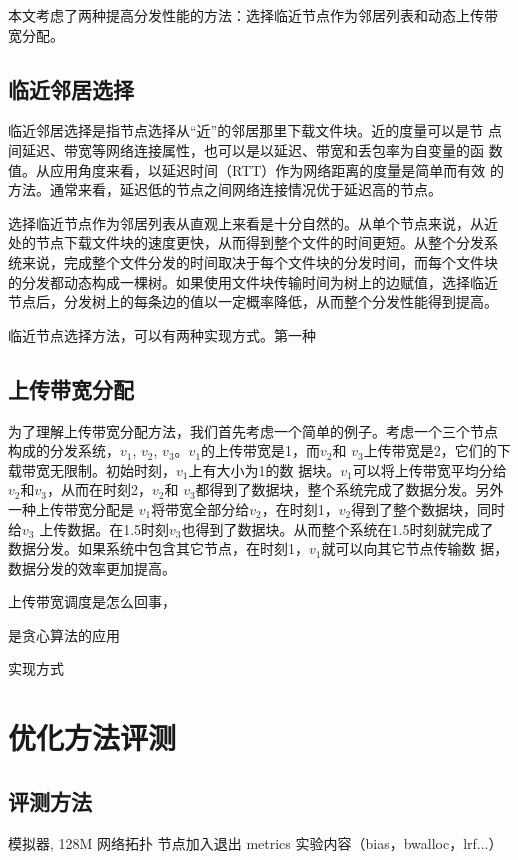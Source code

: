 本文考虑了两种提高分发性能的方法：选择临近节点作为邻居列表和动态上传带
宽分配。

\subsection{临近邻居选择}


临近邻居选择是指节点选择从“近”的邻居那里下载文件块。近的度量可以是节
点间延迟、带宽等网络连接属性，也可以是以延迟、带宽和丢包率为自变量的函
数值。从应用角度来看，以延迟时间（RTT）作为网络距离的度量是简单而有效
的方法。通常来看，延迟低的节点之间网络连接情况优于延迟高的节点。


选择临近节点作为邻居列表从直观上来看是十分自然的。从单个节点来说，从近
处的节点下载文件块的速度更快，从而得到整个文件的时间更短。从整个分发系
统来说，完成整个文件分发的时间取决于每个文件块的分发时间，而每个文件块
的分发都动态构成一棵树。如果使用文件块传输时间为树上的边赋值，选择临近
节点后，分发树上的每条边的值以一定概率降低，从而整个分发性能得到提高。

临近节点选择方法，可以有两种实现方式。第一种

\subsection{上传带宽分配}

为了理解上传带宽分配方法，我们首先考虑一个简单的例子。考虑一个三个节点
构成的分发系统，$v_1$, $v_2$, $v_3$。$v_1$的上传带宽是1，而$v_2$和
$v_3$上传带宽是2，它们的下载带宽无限制。初始时刻，$v_1$上有大小为1的数
据块。$v_1$可以将上传带宽平均分给$v_2$和$v_3$，从而在时刻2，$v_2$和
$v_3$都得到了数据块，整个系统完成了数据分发。另外一种上传带宽分配是
$v_1$将带宽全部分给$v_2$，在时刻1，$v_2$得到了整个数据块，同时给$v_3$
上传数据。在1.5时刻$v_3$也得到了数据块。从而整个系统在1.5时刻就完成了
数据分发。如果系统中包含其它节点，在时刻1，$v_1$就可以向其它节点传输数
据，数据分发的效率更加提高。

上传带宽调度是怎么回事，

是贪心算法的应用

实现方式

\section{优化方法评测}

\subsection{评测方法}
模拟器, 128M
网络拓扑
节点加入退出
metrics
实验内容（bias，bwalloc，lrf...）


